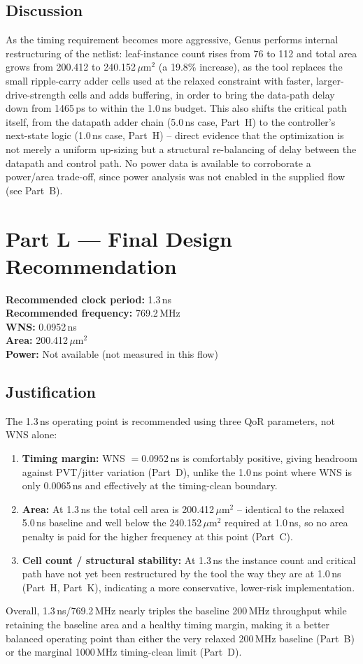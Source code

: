 \documentclass[11pt]{article}
\begin{document}
\subsection*{Discussion}
As the timing requirement becomes more aggressive, Genus performs internal restructuring of the
netlist: leaf-instance count rises from 76 to 112 and total area grows from 200.412 to
240.152\,$\mu$m$^2$ (a 19.8\% increase), as the tool replaces the small ripple-carry adder cells
used at the relaxed constraint with faster, larger-drive-strength cells and adds buffering, in
order to bring the data-path delay down from 1465\,ps to within the 1.0\,ns budget. This also
shifts the critical path itself, from the datapath adder chain (5.0\,ns case, Part~H) to the
controller's next-state logic (1.0\,ns case, Part~H) -- direct evidence that the optimization is not
merely a uniform up-sizing but a structural re-balancing of delay between the datapath and control
path. No power data is available to corroborate a power/area trade-off, since power analysis was
not enabled in the supplied flow (see Part~B).

\section{Part L --- Final Design Recommendation}
\textbf{Recommended clock period:} 1.3\,ns\\
\textbf{Recommended frequency:} 769.2\,MHz\\
\textbf{WNS:} 0.0952\,ns\\
\textbf{Area:} 200.412\,$\mu$m$^2$\\
\textbf{Power:} Not available (not measured in this flow)

\subsection*{Justification}
The 1.3\,ns operating point is recommended using three QoR parameters, not WNS alone:
\begin{enumerate}
    \item \textbf{Timing margin:} WNS $=0.0952$\,ns is comfortably positive, giving headroom
    against PVT/jitter variation (Part~D), unlike the 1.0\,ns point where WNS is only 0.0065\,ns
    and effectively at the timing-clean boundary.
    \item \textbf{Area:} At 1.3\,ns the total cell area is 200.412\,$\mu$m$^2$ -- identical to the
    relaxed 5.0\,ns baseline and well below the 240.152\,$\mu$m$^2$ required at 1.0\,ns, so no area
    penalty is paid for the higher frequency at this point (Part~C).
    \item \textbf{Cell count / structural stability:} At 1.3\,ns the instance count and critical
    path have not yet been restructured by the tool the way they are at 1.0\,ns (Part~H, Part~K),
    indicating a more conservative, lower-risk implementation.
\end{enumerate}
Overall, 1.3\,ns/769.2\,MHz nearly triples the baseline 200\,MHz throughput while retaining the
baseline area and a healthy timing margin, making it a better balanced operating point than either
the very relaxed 200\,MHz baseline (Part~B) or the marginal 1000\,MHz timing-clean limit (Part~D).
\end{document}
